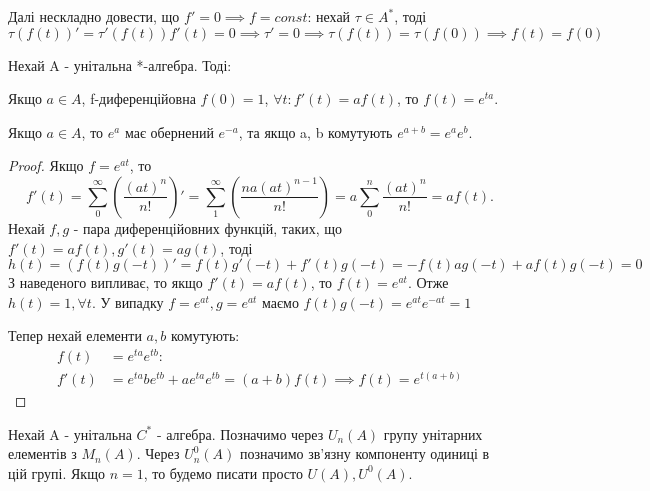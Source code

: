 Далі нескладно довести, що $f' = 0 \implies f = const$:
нехай $\tau \in A^*$, тоді $\tau(f(t))' = \tau'(f(t)) f'(t) = 0 \implies \tau' = 0 \implies
\tau(f(t)) = \tau(f(0)) \implies f(t) = f(0)$
\begin{theorem}
    Нехай A - унітальна *-алгебра.
    Тоді:
    \item
    Якщо $a \in A$, f-диференційовна $f(0) = 1$, $ \forall t: f'(t) = af(t)$, то $f(t) = e^{ta}$.
    \item
    Якщо $a \in A$, то $e^a$ має обернений $e^{-a}$, та якщо a, b комутують $e^{a+b} = e^a e^b$.
    \begin{proof}
        Якщо $f= e^{at}$, то
        \begin{equation*}
            f'(t) = \sum_0^{\infty} (\frac{(at)^n}{n!})' =
            \sum_1^{\infty} (\frac{n a (at)^{n-1}}{n!}) =
            a \sum_0^n \frac{(at)^n}{n!} = a f(t).
        \end{equation*}
        Нехай $f, g$ - пара диференційовних функцій, таких, що $f'(t) = af(t), g'(t) = ag(t)$, тоді
        \begin{equation*}
            h(t) = (f(t)g(-t))' = f(t)g'(-t) + f'(t)g(-t) = - f(t)ag(-t) + af(t)g(-t) = 0
        \end{equation*}
        З наведеного випливає, то якщо $f'(t) = af(t)$, то $f(t) = e^{at}$.
        Отже $h(t) = 1, \forall t$.
        У випадку $f = e^{at}, g = e^{at}$ маємо $f(t)g(-t) = e^{at} e^{-at} = 1$

        Тепер нехай елементи $a,b$ комутують:
        \begin{align*}
            f(t) &= e^{ta}e^{tb}: \\
            f'(t) &= e^{ta} b e^{tb} + a e^{ta} e^{tb} = (a+b)f(t) \implies f(t) = e^{t(a+b)}
        \end{align*}
    \end{proof}
\end{theorem}

Нехай A - унітальна $C^*$ - алгебра.
Позначимо через $U_n(A)$ групу унітарних елементів з $M_n(A)$.
Через $U_n^0(A)$ позначимо зв'язну компоненту одиниці в цій групі.
Якщо $n = 1$, то будемо писати просто $U(A), U^0(A)$.

